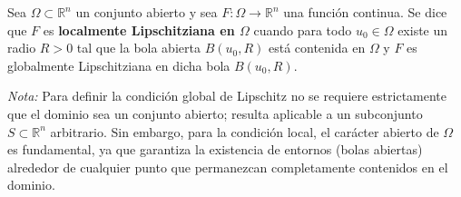 \begin{definición}
    Sea $\Omega \subset \mathbb{R}^n$ un conjunto abierto y sea $F : \Omega \to \mathbb{R}^n$ una función continua. Se dice que $F$ es \textbf{localmente Lipschitziana en $\Omega$} cuando para todo $u_0 \in \Omega$ existe un radio $R > 0$ tal que la bola abierta $B(u_0, R)$ está contenida en $\Omega$ y $F$ es globalmente Lipschitziana en dicha bola $B(u_0, R)$.  
\end{definición}

\textit{Nota:} Para definir la condición global de Lipschitz no se requiere estrictamente que el dominio sea un conjunto abierto; resulta aplicable a un subconjunto $S \subset \mathbb{R}^n$ arbitrario. Sin embargo, para la condición local, el carácter abierto de $\Omega$ es fundamental, ya que garantiza la existencia de entornos (bolas abiertas) alrededor de cualquier punto que permanezcan completamente contenidos en el dominio.

